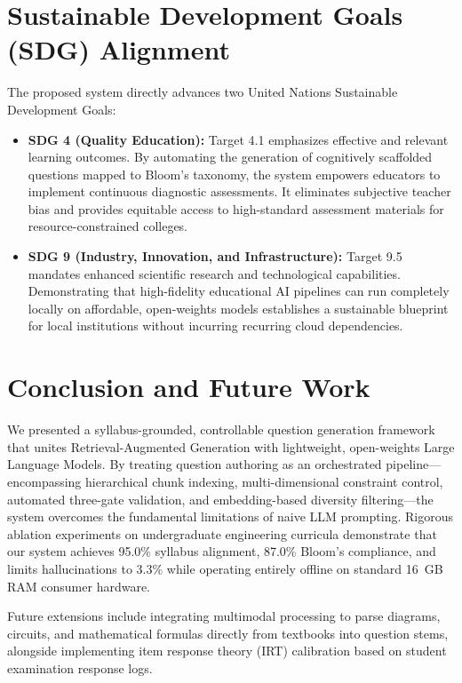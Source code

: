 \documentclass[conference]{IEEEtran}
\begin{document}
\section{Sustainable Development Goals (SDG) Alignment}

The proposed system directly advances two United Nations Sustainable Development Goals:
\begin{itemize}
    \item \textbf{SDG 4 (Quality Education):} Target 4.1 emphasizes effective and relevant learning outcomes. By automating the generation of cognitively scaffolded questions mapped to Bloom's taxonomy, the system empowers educators to implement continuous diagnostic assessments. It eliminates subjective teacher bias and provides equitable access to high-standard assessment materials for resource-constrained colleges.
    \item \textbf{SDG 9 (Industry, Innovation, and Infrastructure):} Target 9.5 mandates enhanced scientific research and technological capabilities. Demonstrating that high-fidelity educational AI pipelines can run completely locally on affordable, open-weights models establishes a sustainable blueprint for local institutions without incurring recurring cloud dependencies.
\end{itemize}

\section{Conclusion and Future Work}

We presented a syllabus-grounded, controllable question generation framework that unites Retrieval-Augmented Generation with lightweight, open-weights Large Language Models. By treating question authoring as an orchestrated pipeline---encompassing hierarchical chunk indexing, multi-dimensional constraint control, automated three-gate validation, and embedding-based diversity filtering---the system overcomes the fundamental limitations of naive LLM prompting. Rigorous ablation experiments on undergraduate engineering curricula demonstrate that our system achieves 95.0\% syllabus alignment, 87.0\% Bloom's compliance, and limits hallucinations to 3.3\% while operating entirely offline on standard 16~GB RAM consumer hardware.

Future extensions include integrating multimodal processing to parse diagrams, circuits, and mathematical formulas directly from textbooks into question stems, alongside implementing item response theory (IRT) calibration based on student examination response logs.
\end{document}
